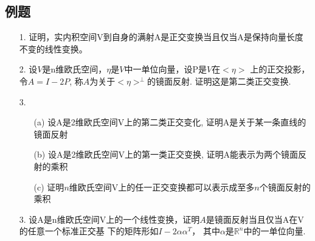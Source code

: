 \subsection{例题}
\begin{itemize}
    \item[1.] 证明，实内积空间V到自身的满射A是正交变换当且仅当A是保持向量长度不变的线性变换。
    \vspace{2cm}

    \item[2.] 设$V$是n维欧氏空间，$\eta$是$V$中一单位向量，设P是$V$在$<\eta>$
    上的正交投影，令$A=I-2P$, 称$A$为关于$<\eta>^{\perp}$的镜面反射. 证明这是第二类正交变换. 
    \vspace{2cm}

    \item[3.] 
    \begin{itemize}
        \item [(a)] 设A是2维欧氏空间V上的第二类正交变化, 证明A是关于某一条直线的镜面反射
        \item [(b)] 设A是2维欧氏空间V上的第一类正交变换, 证明A能表示为两个镜面反射的乘积
        \item [(c)] 证明$n$维欧氏空间V上的任一正交变换都可以表示成至多$n$个镜面反射的乘积
        
            
    \end{itemize}
    \vspace{2cm}
    
    \item[3.] 设A是n维欧氏空间V上的一个线性变换，证明$A$是镜面反射当且仅当A在V的任意一个标准正交基
    下的矩阵形如$I-2\alpha \alpha^T$， 其中$\alpha$是$\mathbb{R}^n$中的一单位向量.
    \vspace{3cm}


\end{itemize}
